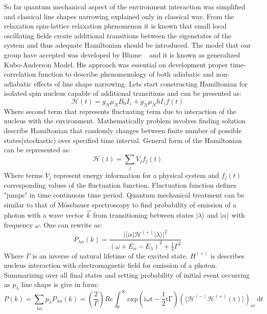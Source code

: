 So far quantum mechanical aspect of the environment interaction was simplified and classical line shapes narrowing explained only in classical way. From the relaxation spin-lattice relaxation phenomenon it is known that small local oscillating fields create additional transitions between the eigenstates of the system and thus adequate Hamiltonian should be introduced. The model that our group have accepted was developed by Blume ~\cite{blume} and it is known as generalized Kubo-Anderson Model. His approach was essential on development proper time-correlation function to describe phenomenology of both adiabatic and non-adiabatic effects of line shape narrowing. Lets start constructing Hamiltonian for isolated spin nucleus capable of additional transitions and can be presented as: 
\begin{equation}\label{eq:29}
\mathcal{H}(t)=g_N\mu_NB_0I_z+g_N\mu_NhI_zf(t)
\end{equation} 
Where second term that represents fluctuating term due to interaction of the nucleus with the environment. Mathematically problem involves finding solution describe Hamiltonian that randomly changes between finite number of possible states(stochastic) over specified time interval. General form of the Hamiltonian can be represented as: 
\begin{equation}\label{eq:ham}
\mathcal{H}(t)=\sum_jV_jf_j(t)
\end{equation}  
Where terms $V_j$ represent energy information for a physical system and $f_j(t)$ corresponding values of the fluctuation function. Fluctuation function defines "jumps" in time continuous time period. Quantum mechanical treatment can be similar to that of M{\"o}ssbauer spectroscopy to find probability of emission of a photon with a wave vector $\vec{k}$ from transitioning between states $|\lambda\rangle$ and $|\alpha\rangle$ with frequency $\omega$. One can rewrite as:
\begin{equation}\label{eq:30}
P_{\lambda \alpha}(k)=\frac{|\langle \alpha|\mathcal{H}^{(+)}|\lambda\rangle|^2}{(\omega+E_{\alpha}-E_{\lambda})^2+\frac{1}{4}\Gamma^2}
\end{equation} 
Where $\Gamma$ is an inverse of natural lifetime of the excited state. $H^{(+)}$ is describes nucleus interaction with electromagnetic field for emission of a photon. Summarizing over all final states and setting probability of initial event occurring as $p_{\lambda}$ line shape is give in form:
\begin{equation}\label{eq:31}
P(k)=\sum_{\substack{\lambda\alpha}}p_{\lambda}P_{\lambda\alpha}(k)= \left(\frac{2}{\Gamma}\right)Re \int_0^\infty\mathrm{exp(i\omega t-\frac{1}{2}t\Gamma) (\langle \mathcal{H}^{(-)}\mathcal{H}^{(+)}(t) \rangle)_{av} }\,\mathrm{d}t
\end{equation}     
